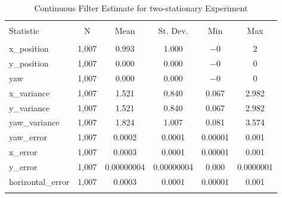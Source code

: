 
\begin{table}[h] \centering 
  \caption{Continuous Filter Estimate for two-stationary Experiment} 
  \label{tab:two_stationary_continuous_summary} 
\begin{tabular}{@{\extracolsep{5pt}}lccccc} 
\\[-1.8ex]\hline 
\hline \\[-1.8ex] 
Statistic & \multicolumn{1}{c}{N} & \multicolumn{1}{c}{Mean} & \multicolumn{1}{c}{St. Dev.} & \multicolumn{1}{c}{Min} & \multicolumn{1}{c}{Max} \\ 
\hline \\[-1.8ex] 
x\_position & 1,007 & 0.993 & 1.000 & $-$0 & 2 \\ 
y\_position & 1,007 & 0.000 & 0.000 & $-$0 & 0 \\ 
yaw & 1,007 & 0.000 & 0.000 & $-$0 & 0 \\ 
x\_variance & 1,007 & 1.521 & 0.840 & 0.067 & 2.982 \\ 
y\_variance & 1,007 & 1.521 & 0.840 & 0.067 & 2.982 \\ 
yaw\_variance & 1,007 & 1.824 & 1.007 & 0.081 & 3.574 \\ 
yaw\_error & 1,007 & 0.0002 & 0.0001 & 0.00001 & 0.001 \\ 
x\_error & 1,007 & 0.0003 & 0.0001 & 0.00001 & 0.001 \\ 
y\_error & 1,007 & 0.00000004 & 0.00000004 & 0.000 & 0.0000001 \\ 
horizontal\_error & 1,007 & 0.0003 & 0.0001 & 0.00001 & 0.001 \\ 
\hline \\[-1.8ex] 
\end{tabular} 
\end{table} 
